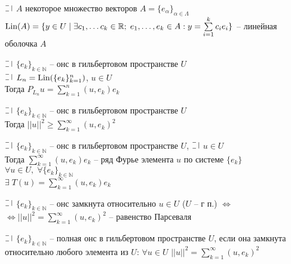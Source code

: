 \begin{definition}
  $\letus$ $A$ некоторое множество векторов $A = \{e_\alpha\}_{\alpha \in \Lambda}$\\
  $\text{Lin}(A) = \{y \in U \mid \exists c_1, \dots c_k \in \mathbb{R}; \; e_{1}, \dots, e_{k} \in A: 
  y = \sum\limits_{i=1}^{k}c_i e_{i}\}$ -- линейная оболочка $A$
\end{definition}

\begin{theorem}
  $\letus$ $\{e_k\}_{k \in \mathbb{N}}$ -- онс в гильбертовом пространстве $U$\\
  $\letus$ $L_n = \text{Lin}(\{e_k\}_{k=1}^{n})$, $u \in U$\\
  Тогда $P_{L_n}u = \sum\limits_{k=1}^{n}(u, e_k)e_k$
\end{theorem}

\begin{definition}
  $\letus$ $\{e_k\}_{k \in \mathbb{N}}$ -- онс в гильбертовом пространстве $U$\\
  Тогда $||u||^2 \ge \sum\limits_{k=1}^{\infty}(u, e_k)^2$
\end{definition}

\begin{definition}
  $\letus$ $\{e_k\}_{k \in \mathbb{N}}$ -- онс в гильбертовом пространстве $U$, $\letus$ $u \in U$\\
  Тогда $\sum\limits_{k=1}^{\infty}(u, e_k)e_k$ -- ряд Фурье элемента $u$ по системе $\{e_k\}$\\
  $\forall u \in U, \; \forall \{e_k\}_{k \in \mathbb{N}}$\\
  $\exists \; T(u) = \sum\limits_{k=1}^{\infty}(u, e_k)e_k$
\end{definition}

\begin{definition}
  $\letus$ $\{e_k\}_{k \in \mathbb{N}}$ -- онс замкнута относительно $u \in U$ ($U$ -- г п.) $\Leftrightarrow$ \\
  $\Leftrightarrow ||u||^2 = \sum\limits_{k=1}^{\infty}(u, e_k)^2$ -- равенство Парсеваля 
\end{definition}

\begin{definition}
  $\letus$ $\{e_k\}_{k \in \mathbb{N}}$ -- полная онс в гильбертовом пространстве $U$, если она замкнута относительно
  любого элемента из $U$: $\forall u \in U$ $||u||^2 = \sum\limits_{k=1}^{\infty}(u, e_k)^2$
\end{definition}


